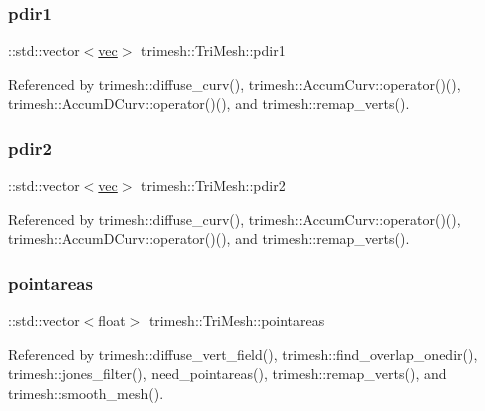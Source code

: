 \mbox{\label{classtrimesh_1_1TriMesh_a6b7ecb1bb2d796fa9be744f30d40c10d}} 
\subsubsection{\texorpdfstring{pdir1}{pdir1}}
{\footnotesize\ttfamily \+::std\+::vector$<$\hyperlink{namespacetrimesh_a4fc2b83feba99c931f837a0c7d4b4df1}{vec}$>$ trimesh\+::\+Tri\+Mesh\+::pdir1}



Referenced by trimesh\+::diffuse\+\_\+curv(), trimesh\+::\+Accum\+Curv\+::operator()(), trimesh\+::\+Accum\+D\+Curv\+::operator()(), and trimesh\+::remap\+\_\+verts().

\mbox{\label{classtrimesh_1_1TriMesh_a4e01dd13cfdac282bec1f14516745489}} 
\subsubsection{\texorpdfstring{pdir2}{pdir2}}
{\footnotesize\ttfamily \+::std\+::vector$<$\hyperlink{namespacetrimesh_a4fc2b83feba99c931f837a0c7d4b4df1}{vec}$>$ trimesh\+::\+Tri\+Mesh\+::pdir2}



Referenced by trimesh\+::diffuse\+\_\+curv(), trimesh\+::\+Accum\+Curv\+::operator()(), trimesh\+::\+Accum\+D\+Curv\+::operator()(), and trimesh\+::remap\+\_\+verts().

\mbox{\label{classtrimesh_1_1TriMesh_a5ed922bd99d163265811f6f0ed518995}} 
\subsubsection{\texorpdfstring{pointareas}{pointareas}}
{\footnotesize\ttfamily \+::std\+::vector$<$float$>$ trimesh\+::\+Tri\+Mesh\+::pointareas}



Referenced by trimesh\+::diffuse\+\_\+vert\+\_\+field(), trimesh\+::find\+\_\+overlap\+\_\+onedir(), trimesh\+::jones\+\_\+filter(), need\+\_\+pointareas(), trimesh\+::remap\+\_\+verts(), and trimesh\+::smooth\+\_\+mesh().

